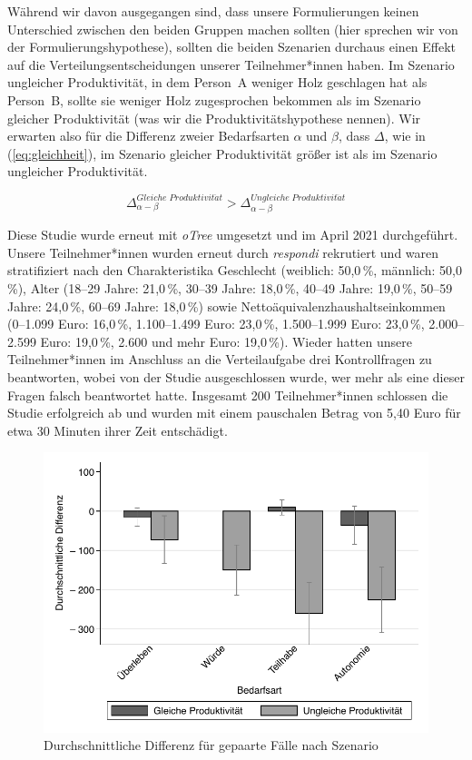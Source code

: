 \documentclass[justified,nobib,symmetric,twoside]{tufte-handout}
\begin{document}
Während wir davon ausgegangen sind, dass unsere Formulierungen keinen Unterschied zwischen den beiden Gruppen machen sollten (hier sprechen wir von der Formulierungshypothese), sollten die beiden Szenarien durchaus einen Effekt auf die Verteilungsentscheidungen unserer Teilnehmer*innen haben.
Im Szenario ungleicher Produktivität, in dem Person~A weniger Holz geschlagen hat als Person~B, sollte sie weniger Holz zugesprochen bekommen als im Szenario gleicher Produktivität (was wir die Produktivitätshypothese nennen).
Wir erwarten also für die Differenz zweier Bedarfsarten $\alpha$ und $\beta$, dass $\Delta$, wie in (\ref{eq:gleichheit}), im Szenario gleicher Produktivität größer ist als im Szenario ungleicher Produktivität.

\begin{equation}\label{eq:gleichheit}
   \Delta^{Gleiche\;Produktivit\ddot{a}t}_{\alpha-\beta}>\Delta^{Ungleiche\;Produktivit\ddot{a}t}_{\alpha-\beta}
\end{equation}

Diese Studie wurde erneut mit \textit{oTree} umgesetzt und im April 2021 durchgeführt.
Unsere Teilnehmer*innen wurden erneut durch \textit{respondi} rekrutiert und waren stratifiziert nach den Charakteristika Geschlecht (weiblich: 50,0\,\%, männlich: 50,0\,\%), Alter (18--29 Jahre: 21,0\,\%, 30--39 Jahre: 18,0\,\%, 40--49 Jahre: 19,0\,\%, 50--59 Jahre: 24,0\,\%, 60--69 Jahre: 18,0\,\%) sowie Nettoäquivalenzhaushaltseinkommen (0--1.099 Euro: 16,0\,\%, 1.100--1.499 Euro: 23,0\,\%, 1.500--1.999 Euro: 23,0\,\%, 2.000--2.599 Euro: 19,0\,\%, 2.600 und mehr Euro: 19,0\,\%).
Wieder hatten unsere Teilnehmer*innen im Anschluss an die Verteilaufgabe drei Kontrollfragen zu beantworten, wobei von der Studie ausgeschlossen wurde, wer mehr als eine dieser Fragen falsch beantwortet hatte.
Insgesamt 200 Teilnehmer*innen schlossen die Studie erfolgreich ab und wurden mit einem pauschalen Betrag von 5,40 Euro für etwa 30 Minuten ihrer Zeit entschädigt.

\begin{figure}[t]\label{fig:abbildung_16}
   \center
   \caption{Durchschnittliche Differenz für gepaarte Fälle nach Szenario}
   \includegraphics[width=0.99\linewidth]{figure_16.pdf}
\end{figure}
\end{document}

